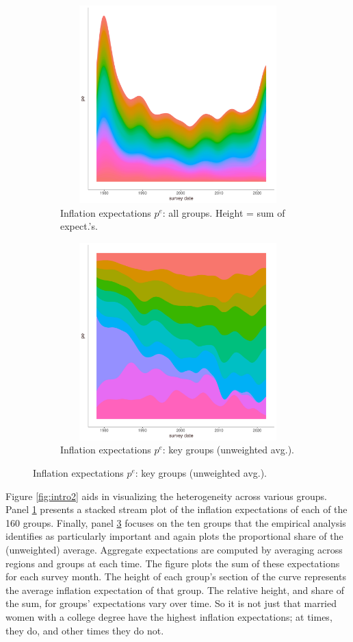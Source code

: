 \documentclass[12pt]{article}
\begin{document}
\begin{figure}
\centering
\caption{Diversity of inflation survey expectations: by groups}\label{fig:intro2}
\begin{subfigure}[t]{0.75\textwidth}
\includegraphics[width = 5in, height =3in]{figs/aggIndComp}
\caption{Inflation expectations $p^e$: all groups. Height = sum of expect.'s.}\label{fig:groupExpects}
\end{subfigure}
\vfill
\begin{subfigure}[t]{0.75\textwidth}
\includegraphics[width = 5in, height =3in]{figs/weightsTop10comp}
\caption{Inflation expectations $p^e$: key groups (unweighted avg.).}\label{fig:top10Expects}
\end{subfigure}
\end{figure}


Figure \ref{fig:intro2} aids in visualizing the heterogeneity across various groups. Panel \ref{fig:groupExpects} presents a stacked stream plot of the inflation expectations of each of the 160 groups. Finally, panel \ref{fig:top10Expects} focuses on the ten groups that the empirical analysis identifies as particularly important and again plots the proportional share of the (unweighted) average. Aggregate expectations are computed by averaging across regions and groups at each time. The figure plots the sum of these expectations for each survey month. The height of each group's section of the curve represents the average inflation expectation of that group. The relative height, and share of the sum, for groups' expectations vary over time. So it is not just that married women with a college degree have the highest inflation expectations; at times, they do, and other times they do not. 
\end{document}
